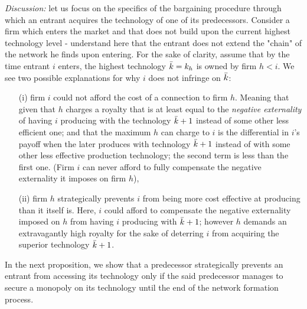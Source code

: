 \documentclass{article}
\begin{document}
\indent \textit{Discussion:} let us focus on the specifics of the bargaining procedure through which an entrant acquires the technology of one of its predecessors. Consider a firm which enters the market and that does not build upon the current highest technology level - understand here that the entrant does not extend the "chain" of the network he finds upon entering. For the sake of clarity, assume that by the time entrant $i$ enters, the highest technology $\Bar{k}=k_h$ is owned by firm $h<i$. We see two possible explanations for why $i$ does not infringe on $\Bar{k}$: 
\begin{enumerate}
    \item[(i)] firm $i$ could not afford the cost of a connection to firm $h$. Meaning that given that $h$ charges a royalty that is at least equal to the \textit{negative externality} of having $i$ producing with the technology $\Bar{k}+1$ instead of some other less efficient one; and that the maximum $h$ can charge to $i$ is the differential in $i$'s payoff when the later produces with technology $\Bar{k}+1$ instead of with some other less effective production technology; the second term is less than the first one. (Firm $i$ can never afford to fully compensate the negative externality it imposes on firm $h$),
    \item[(ii)] firm $h$ strategically prevents $i$ from being more cost effective at producing than it itself is. Here, $i$ could afford to compensate the negative externality imposed on $h$ from having $i$ producing with $\Bar{k}+1$; however $h$ demands an extravagantly high royalty for the sake of deterring $i$ from acquiring the superior technology $\Bar{k}+1$. 
\end{enumerate}

\indent In the next proposition, we show that a predecessor strategically prevents an entrant from accessing its technology only if the said predecessor manages to secure a monopoly on its technology until the end of the network formation process. \\
\end{document}
